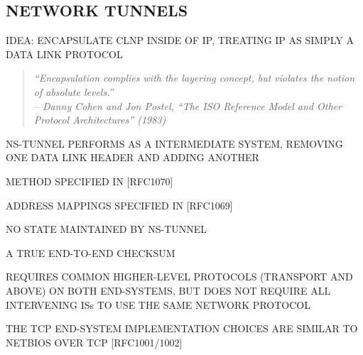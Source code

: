 \begin{bwslide}
\part*	{NETWORK TUNNELS}\bf

\begin{nrtc}
\item	IDEA: ENCAPSULATE CLNP INSIDE OF IP, TREATING IP AS SIMPLY A DATA LINK
	PROTOCOL
\begin{quote}\em
``Encapsulation complies with the layering concept, but violates the notion
of absolute levels.''\\ \raggedleft
-- Danny Cohen and Jon Postel, ``The ISO Reference Model and Other Protocol
Architectures'' (1983)
\end{quote}

\item	NS-TUNNEL PERFORMS AS A INTERMEDIATE SYSTEM,
	REMOVING ONE DATA LINK HEADER AND ADDING ANOTHER

\item	METHOD SPECIFIED IN [RFC1070]

\item	ADDRESS MAPPINGS SPECIFIED IN [RFC1069] 
\end{nrtc}
\end{bwslide}






\begin{bwslide}

\begin{nrtc}
\item	NO STATE MAINTAINED BY NS-TUNNEL

\item	A TRUE END-TO-END CHECKSUM
\end{nrtc}
\end{bwslide}


\begin{bwslide}

\begin{nrtc}
\item	REQUIRES COMMON HIGHER-LEVEL PROTOCOLS (TRANSPORT AND ABOVE) ON BOTH
	END-SYSTEMS, BUT DOES NOT REQUIRE ALL INTERVENING ISs TO USE THE
	SAME NETWORK PROTOCOL

\item	THE TCP END-SYSTEM IMPLEMENTATION CHOICES ARE SIMILAR TO NETBIOS OVER
	TCP [RFC1001/1002]
\end{nrtc}
\end{bwslide}


